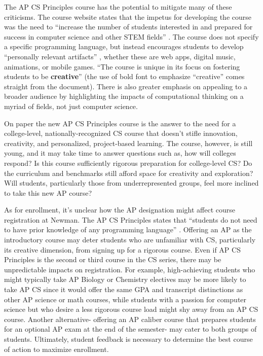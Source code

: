 The AP CS Principles course has the potential to mitigate many of these criticisms. The course website states that the impetus for developing the course was the need to ``increase the number of students interested in and prepared for success in computer science and other STEM fields'' \cite{apcsfaq}. The course does not specify a specific programming language, but instead encourages students to develop ``personally relevant artifacts'' \cite{apframe}, whether these are web apps, digital music, animations, or mobile games. ``The course is unique in its focus on fostering students to be \textbf{creative}'' \cite{apframe} (the use of bold font to emphasize ``creative'' comes straight from the document).  There is also greater emphasis on appealing to a broader audience by highlighting the impacts of computational thinking on a myriad of fields, not just computer science. \par

On paper the new AP CS Principles course is the answer to the need for a college-level, nationally-recognized CS course that doesn't stifle innovation, creativity, and personalized, project-based learning. The course, however, is still young, and it may take time to answer questions such as, how will colleges respond? Is this course sufficiently rigorous preparation for college-level CS? Do the curriculum and benchmarks still afford space for creativity and exploration? Will students, particularly those from underrepresented groups, feel more inclined to take this new AP course? \par
 
As for enrollment, it's unclear how the AP designation might affect course registration at Newman. The AP CS Principles states that ``students do not need to have prior knowledge of any programming language'' \cite{apcsfaq}. Offering an AP as the introductory course may deter students who are unfamiliar with CS, particularly its creative dimension, from signing up for a rigorous course. Even if AP CS Principles is the second or third course in the CS series, there may be unpredictable impacts on registration. For example, high-achieving students who might typically take AP Biology or Chemistry electives may be more likely to take AP CS since it would offer the same GPA and transcript distinctions as other AP science or math courses, while students with a passion for computer science but who desire a less rigorous course load might shy away from an AP CS course. Another alternative- offering an AP caliber course that prepares students for an optional AP exam at the end of the semester- may cater to both groups of students. Ultimately, student feedback is necessary to determine the best course of action to maximize enrollment. \par


